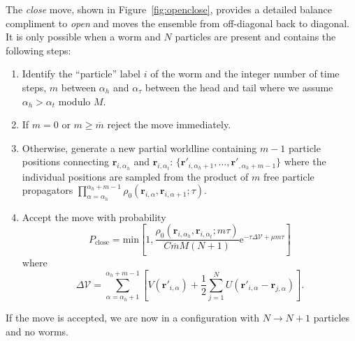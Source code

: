 \documentclass[prb,aps,amssym,nofootinbib,floatfix,notitlepage]{revtex4-1}
\renewcommand{\vec}[1]{\boldsymbol{#1}}
\newcommand{\e}[1]{\mathrm{e}^{#1}}
\begin{document}
\noindent
The \emph{close} move, shown in Figure~\ref{fig:openclose}, provides a detailed balance compliment to \emph{open} and
moves the ensemble from off-diagonal back to diagonal. It is only possible when
a worm and $N$ particles are present and contains the following steps:
\begin{enumerate}
    \item Identify the ``particle'' label $i$ of the worm and the integer number of time steps, $m$ between $\alpha_h$ and
        $\alpha_\tau$ between the head and tail where we assume $\alpha_h > \alpha_t$ modulo $M$.
\item If $m=0$ or $m\ge \overline{m}$ reject the move immediately.
\item Otherwise, generate a new partial worldline containing $m-1$ particle positions connecting 
    $\vec{r}_{i,\alpha_h}$ and $\vec{r}_{i,\alpha_t}$: $\{\vec{r}'_{i,\alpha_h+1},\ldots,
    \vec{r}'_{,\alpha_h+m-1}\}$ where the individual positions are sampled from
    the product of $m$ free particle propagators
    $\prod_{\alpha=\alpha_h}^{\alpha_h+m-1}
    \rho_0(\vec{r}_{i,\alpha},\vec{r}_{i,\alpha+1};\tau)$.
\item Accept the move with probability
\begin{equation}
    P_{\text{close}} = \mathrm{min} \left[1,
        \frac{\rho_0(\vec{r}_{i,\alpha_h},\vec{r}_{i,\alpha_t}; m \tau)}{C
    \overline{m}M (N+1)} \e{-\tau \Delta \mathcal{V} + \mu m \tau} \right]
\end{equation}
%
where
%
\begin{equation}
    \Delta\mathcal{V} = \sum_{\alpha=\alpha_h+1}^{\alpha_h+m-1} \left[ 
        V(\vec{r}'_{i,\alpha}) + \frac{1}{2}\sum_{j=1}^N
        U(\vec{r}'_{i,\alpha}-\vec{r}_{j,\alpha}) \right].
\end{equation}
%
\end{enumerate}
If the move is accepted, we are now in a configuration with $N \to N+1$
particles and no worms.
\end{document}
